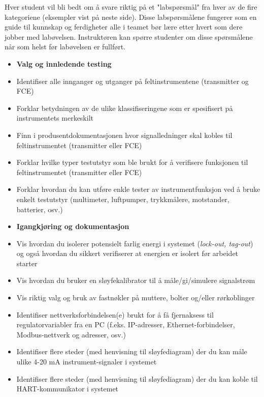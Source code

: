 Hver student vil bli bedt om å svare riktig på et "labspørsmål" fra hver av de fire kategoriene (eksempler vist på neste side).  Disse labspørsmålene fungerer som en guide til kunnskap og ferdigheter alle i teamet bør lære etter hvert som dere jobber med labøvelsen.  Instruktøren kan spørre studenter om disse spørsmålene når som helst før labøvelsen er fullført.

\vfil \eject

\noindent
{} 

\begin{itemize}
\item{} {\bf Valg og innledende testing}
\item{} Identifiser alle innganger og utganger på feltinstrumentene (transmitter og FCE)
\item{} Forklar betydningen av de ulike klassifiseringene som er spesifisert på instrumentets merkeskilt
\item{} Finn i produsentdokumentasjonen hvor signalledninger skal kobles til feltinstrumentet (transmitter eller FCE)
\item{} Forklar hvilke typer testutstyr som ble brukt for å verifisere funksjonen til feltinstrumentet (transmitter eller FCE)
\item{} Forklar hvordan du kan utføre enkle tester av instrumentfunksjon ved å bruke enkelt testutstyr (multimeter, luftpumper, trykkmålere, motstander, batterier, osv.)
\end{itemize}

\filbreak

\begin{itemize}
\item{} {\bf Igangkjøring og dokumentasjon}
\item{} Vis hvordan du isolerer potensielt farlig energi i systemet ({\it lock-out, tag-out}) og også hvordan du sikkert verifiserer at energien er isolert før arbeidet starter
\item{} Vis hvordan du bruker en sløyfekalibrator til å måle/gi/simulere signalstrøm
\item{} Vis riktig valg og bruk av fastnøkler på muttere, bolter og/eller rørkoblinger
\item{} Identifiser nettverksforbindelsen(e) brukt for å få fjernaksess til regulatorvariabler fra en PC (f.eks. IP-adresser, Ethernet-forbindelser, Modbus-nettverk og adresser, osv.)
\item{} Identifiser flere steder (med henvisning til sløyfediagram) der du kan måle ulike 4-20 mA instrument-signaler i systemet
\item{} Identifiser flere steder (med henvisning til sløyfediagram) der du kan koble til HART-kommunikator i systemet
\end{itemize}

